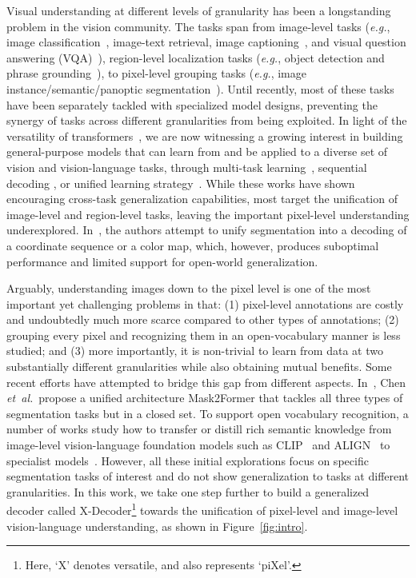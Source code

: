 \documentclass[10pt,twocolumn,letterpaper]{article}
\newcommand{\ourmodel}{X-Decoder}
\begin{document}
Visual understanding at different levels of granularity has been a longstanding problem in the vision community. The tasks span from image-level tasks (\emph{e.g.}, image classification~\cite{deng2009imagenet}, image-text retrieval, image captioning~\cite{chen2015microsoftcoco}, and visual question answering (VQA)~\cite{antol2015vqa}), region-level localization tasks (\emph{e.g.}, object detection and phrase grounding~\cite{plummer2015flickr30k}), to pixel-level grouping tasks (\textit{e.g.}, image instance/semantic/panoptic segmentation~\cite{long2015fully,kirillov2019panoptic,hafiz2020survey}). Until recently, most of these tasks have been separately tackled with specialized model designs, preventing the synergy of tasks across different granularities from being exploited. In light of the versatility of transformers~\cite{vaswani2017attention}, we are now witnessing a growing interest in building general-purpose models that can learn from and be applied to a diverse set of vision and vision-language tasks, through multi-task learning~\cite{hu2021unit,gupta2022towards},  sequential decoding \cite{wang2022ofa,yang2022unitab,chen2022unified, lu2022unified}, or unified learning strategy~\cite{yuan2021florence,yang2022unified, yu2022coca, zhang2022glipv2}. While these works have shown encouraging cross-task generalization capabilities, most target the unification of image-level and region-level tasks, leaving the important pixel-level understanding underexplored. In~\cite{chen2022unified, lu2022unified}, the authors attempt to unify segmentation into a decoding of a coordinate sequence or a color map, which, however, produces suboptimal performance and limited support for open-world generalization.

Arguably, understanding images down to the pixel level is one of the most important yet challenging problems in that: (1) pixel-level annotations are costly and undoubtedly much more scarce compared to other types of annotations; (2) grouping every pixel and recognizing them in an open-vocabulary manner is less studied; and (3) more importantly, it is non-trivial to learn from data at two substantially different granularities while also obtaining mutual benefits. Some recent efforts have attempted to bridge this gap from different aspects. In~\cite{cheng2022masked}, Chen \textit{et~al.}~propose a unified architecture Mask2Former that tackles all three types of segmentation tasks but in a closed set. To support open vocabulary recognition, a number of works study how to transfer or distill rich semantic knowledge from image-level vision-language foundation models such as CLIP~\cite{radford2021learning} and ALIGN~\cite{jia2021scaling} to specialist models~\cite{ghiasi2021open,ding2022open,rao2022denseclip}. However, all these initial explorations focus on specific segmentation tasks of interest and do not show generalization to tasks at different granularities. In this work, we take one step further to build a generalized decoder called \ourmodel{}\footnote{Here, `X' denotes versatile, and also represents `piXel'.} towards the unification of pixel-level and image-level  vision-language understanding, as shown in Figure~\ref{fig:intro}.
\end{document}
